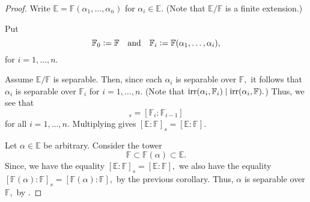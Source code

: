 \sepiffdegequal*\label{thm:sepiffdegequal2}
\begin{flushright}\hyperref[thm:sepiffdegequal]{\upsym}\end{flushright}
\begin{proof}
     Write $\mathbb{E} = \mathbb{F}(\alpha_1, \ldots, \alpha_n)$ for $\alpha_i \in \mathbb{E}.$ (Note that $\mathbb{E}/\mathbb{F}$ is a finite extension.)

    Put 
    \begin{equation*} 
        \mathbb{F}_0 \vcentcolon= \mathbb{F} \quad\text{and}\quad \mathbb{F}_i \vcentcolon= \mathbb{F}(\alpha_1, \ldots, \alpha_i),
    \end{equation*} 
    for $i = 1, \ldots, n.$

    \forward Assume $\mathbb{E}/\mathbb{F}$ is separable. Then, since each $\alpha_i$ is separable over $\mathbb{F},$ it follows that $\alpha_i$ is separable over $\mathbb{F}_i$ for $i = 1, \ldots, n.$ (Note that $\operatorname{irr}(\alpha_i, \mathbb{F}_i) \mid \operatorname{irr}(\alpha_i, \mathbb{F}).$) Thus, we see that 
    \begin{equation*} 
        [\mathbb{F}_{i} : \mathbb{F}_{i - 1}]_s = [\mathbb{F}_{i} : \mathbb{F}_{i - 1}]
    \end{equation*}
    for all $i = 1, \ldots, n.$ Multiplying gives $[\mathbb{E} : \mathbb{F}]_s = [\mathbb{E}:\mathbb{F}].$

    \backward Let $\alpha \in \mathbb{E}$ be arbitrary. Consider the tower
    \begin{equation*} 
        \mathbb{F} \subset \mathbb{F}(\alpha) \subset \mathbb{E}.
    \end{equation*}
    Since, we have the equality $[\mathbb{E} : \mathbb{F}]_s = [\mathbb{E} : \mathbb{F}],$ we also have the equality $[\mathbb{F}(\alpha) : \mathbb{F}]_s = [\mathbb{F}(\alpha) : \mathbb{F}],$ by the previous corollary. Thus, $\alpha$ is separable over $\mathbb{F},$ by .
\end{proof}

